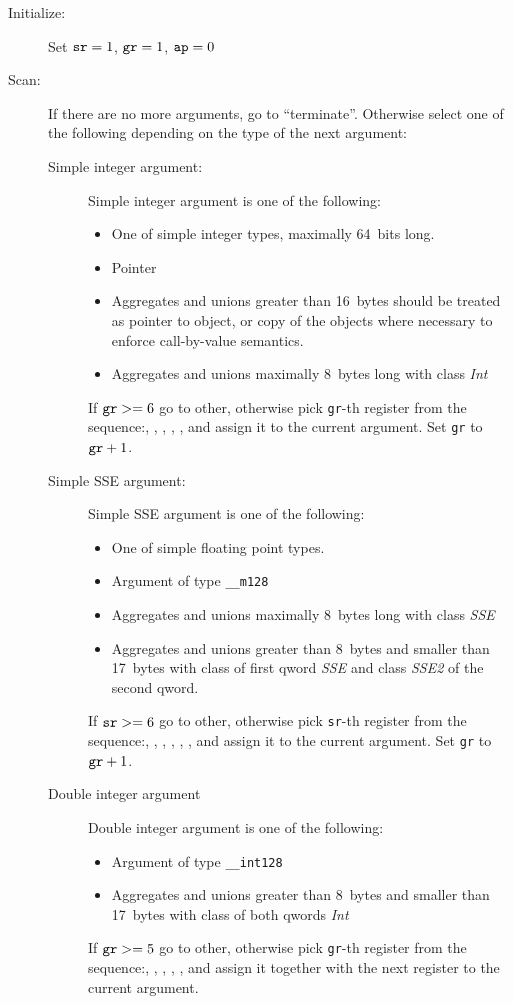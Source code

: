 \begin{description}
\item[Initialize:]
Set $\verb|sr|=1$, $\verb|gr|=1$, $\verb|ap|=0$


\item[Scan:]
If there are no more arguments, go to ``terminate''. Otherwise select one of the
following depending on the type of the next argument:
\begin{description}
\item[Simple integer argument:]
Simple integer argument is one of the following:
\begin{itemize}
\item One of simple integer types, maximally 64~bits long.
\item Pointer
\item Aggregates and unions greater than 16~bytes should be treated as
pointer to object, or copy of the objects where necessary to enforce
call-by-value semantics.
\item Aggregates and unions maximally 8~bytes long with class \emph{Int}
\end{itemize}
If $\verb|gr| >= 6$ go to other, otherwise pick \verb|gr|-th register from
the sequence:\RAX, \RDX, \RCX, \RBX, \RSI, \RDI and assign it to the current
argument. Set \verb|gr| to $\verb|gr|+1$.


\item[Simple SSE argument:]
Simple SSE argument is one of the following:
\begin{itemize}
\item One of simple floating point types.
\item Argument of type \verb|__m128|
\item Aggregates and unions maximally 8~bytes long with class \emph{SSE}
\item Aggregates and unions greater than 8~bytes and smaller than 17~bytes with class of first qword \emph{SSE}
and class \emph{SSE2} of the second qword.
\end{itemize}
If $\verb|sr| >= 6$ go to other, otherwise pick \verb|sr|-th register from
the sequence:, , , , , , 
and assign it to the current argument.
Set \verb|gr| to $\verb|gr|+1$.

\item[Double integer argument]
Double integer argument is one of the following:
\begin{itemize}
\item Argument of type \verb|__int128|
\item Aggregates and unions greater than 8~bytes and smaller than 17~bytes with class of both qwords \emph{Int}
\end{itemize}
If $\verb|gr| >= 5$ go to other, otherwise pick \verb|gr|-th register from
the sequence:\RAX, \RDX, \RCX, \RBX, \RSI, \RDI and assign it together with the
next register to the current argument.


\end{description}
\end{description}
